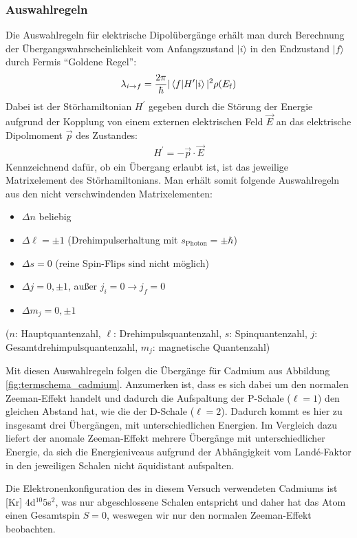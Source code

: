 \documentclass[11pt, a4paper]{article}
\begin{document}
\subsubsection{Auswahlregeln}
\label{sec:auswahlregeln}
Die Auswahlregeln für elektrische Dipolübergänge erhält man durch Berechnung der Übergangswahrscheinlichkeit vom Anfangszustand $|i\rangle$ in den Endzustand $|f\rangle$ durch Fermis "`Goldene Regel"':
\begin{align*}
	\lambda_{i\rightarrow f} = \frac{2 \pi}{\hbar} | \braket{f|H^\prime|i} |^2 \rho(E_\mathrm{f})
\end{align*}
Dabei ist der Störhamiltonian $H^\prime$ gegeben durch die Störung der Energie aufgrund der Kopplung von einem externen elektrischen Feld $\vec{E}$ an das elektrische Dipolmoment $\vec{p}$ des Zustandes:
\begin{align*}
	H^\prime = - \vec{p} \cdot \vec{E}
\end{align*}
Kennzeichnend dafür, ob ein Übergang erlaubt ist, ist das jeweilige Matrixelement des Störhamiltonians.
Man erhält somit folgende Auswahlregeln aus den nicht verschwindenden Matrixelementen:
\begin{itemize}
	\item $\Delta n$ beliebig
	\item $\Delta \ell = \pm 1$ \quad (Drehimpulserhaltung mit $s_\mathrm{Photon} = \pm \hbar$)
	\item $\Delta s = 0$ \quad (reine Spin-Flips sind nicht möglich)
	\item $\Delta j = 0, \pm 1$, außer $j_i=0 \rightarrow j_f=0$
	\item $\Delta m_j = 0, \pm 1$
\end{itemize}
($n$: Hauptquantenzahl, $\ell$: Drehimpulsquantenzahl, $s$: Spinquantenzahl, $j$: Gesamtdrehimpulsquantenzahl, $m_j$: magnetische Quantenzahl)

Mit diesen Auswahlregeln folgen die Übergänge für Cadmium aus Abbildung \ref{fig:termschema_cadmium}.
Anzumerken ist, dass es sich dabei um den normalen Zeeman-Effekt handelt und dadurch die Aufspaltung der P-Schale ($\ell = 1$) den gleichen Abstand hat, wie die der D-Schale ($\ell = 2$).
Dadurch kommt es hier zu insgesamt drei Übergängen, mit unterschiedlichen Energien.
Im Vergleich dazu liefert der anomale Zeeman-Effekt mehrere Übergänge mit unterschiedlicher Energie, da sich die Energieniveaus aufgrund der Abhängigkeit vom Landé-Faktor in den jeweiligen Schalen nicht äquidistant aufspalten.

Die Elektronenkonfiguration des in diesem Versuch verwendeten Cadmiums ist [Kr] $4$d$^{10} 5$s$^2$, was nur abgeschlossene Schalen entspricht und daher hat das Atom einen Gesamtspin $S=0$, weswegen wir nur den normalen Zeeman-Effekt beobachten.
\end{document}
